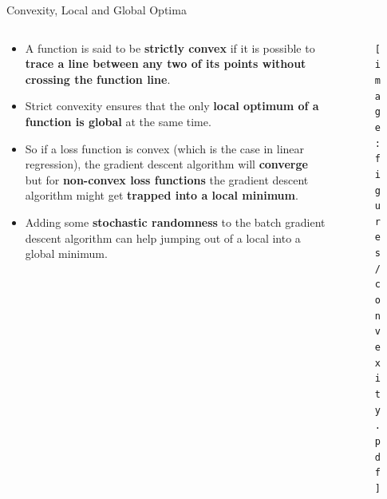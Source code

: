 \documentclass[document.tex]{subfiles}
\begin{document}
    \begin{frame}{Convexity, Local and Global Optima}
        \begin{columns}
            \begin{column}{0.6\textwidth}
                \begin{itemize}
                    \item A function is said to be \textbf{strictly convex} if it is possible to \textbf{trace a line between any two of its points without crossing the function line}.
                    \item Strict convexity ensures that the only \textbf{local optimum of a function is global} at the same time. \item So if a loss function is convex (which is the case in linear regression), the gradient descent algorithm will \textbf{converge} but for \textbf{non-convex loss functions} the gradient descent algorithm might get \textbf{trapped into a local minimum}.
                    \item Adding some \textbf{stochastic randomness} to the batch gradient descent algorithm can help jumping out of a local into a global minimum.
                \end{itemize}
            \end{column}
            \begin{column}{0.4\textwidth}
                \begin{figure}
                    \label{fig:convexity}
                    \texttt{[image: figures/convexity.pdf]}
                \end{figure}
            \end{column}
        \end{columns}	
    \end{frame}
\end{document}
